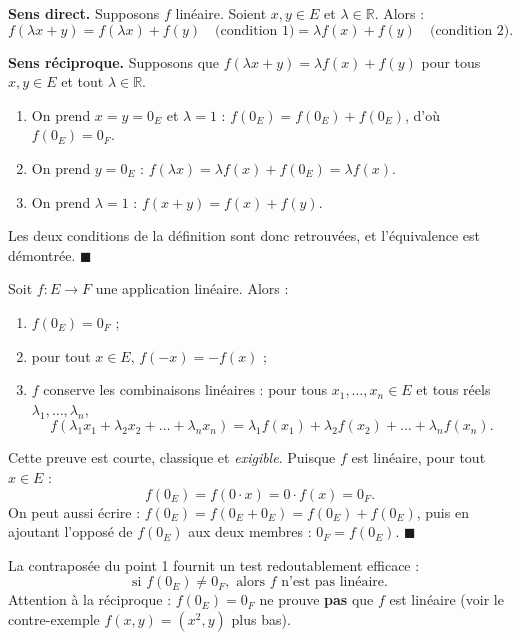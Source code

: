 \documentclass[11pt]{article}
\begin{document}
\begin{experience}
\textbf{Sens direct.} Supposons $f$ linéaire. Soient $x, y \in E$ et $\lambda \in \mathbb{R}$. Alors :
\[ f(\lambda x + y) = f(\lambda x) + f(y) \quad \text{(condition 1)} = \lambda f(x) + f(y) \quad \text{(condition 2)}. \]

\textbf{Sens réciproque.} Supposons que $f(\lambda x + y) = \lambda f(x) + f(y)$ pour tous $x, y \in E$ et tout $\lambda \in \mathbb{R}$.
\begin{enumerate}
\item On prend $x = y = 0_E$ et $\lambda = 1$ : $f(0_E) = f(0_E) + f(0_E)$, d'où $f(0_E) = 0_F$.
\item On prend $y = 0_E$ : $f(\lambda x) = \lambda f(x) + f(0_E) = \lambda f(x)$.
\item On prend $\lambda = 1$ : $f(x + y) = f(x) + f(y)$.
\end{enumerate}
Les deux conditions de la définition sont donc retrouvées, et l'équivalence est démontrée. $\blacksquare$
\end{experience}

\begin{propriete}[Conséquences immédiates -- Démonstration exigible au Probatoire pour $f(0_E)=0_F$]
Soit $f : E \to F$ une application linéaire. Alors :
\begin{enumerate}
\item $f(0_E) = 0_F$ ;
\item pour tout $x \in E$, $f(-x) = -f(x)$ ;
\item $f$ conserve les combinaisons linéaires : pour tous $x_1, \dots, x_n \in E$ et tous réels $\lambda_1, \dots, \lambda_n$,
\[ f(\lambda_1 x_1 + \lambda_2 x_2 + \dots + \lambda_n x_n) = \lambda_1 f(x_1) + \lambda_2 f(x_2) + \dots + \lambda_n f(x_n). \]
\end{enumerate}
\end{propriete}

\begin{experience}[Démonstration : $f(0_E) = 0_F$]
Cette preuve est courte, classique et \emph{exigible}. Puisque $f$ est linéaire, pour tout $x \in E$ :
\[ f(0_E) = f(0 \cdot x) = 0 \cdot f(x) = 0_F. \]
On peut aussi écrire : $f(0_E) = f(0_E + 0_E) = f(0_E) + f(0_E)$, puis en ajoutant l'opposé de $f(0_E)$ aux deux membres : $0_F = f(0_E)$. $\blacksquare$
\end{experience}

\begin{aretenir}
La contraposée du point 1 fournit un test redoutablement efficace :
\[ \text{si } f(0_E) \neq 0_F, \text{ alors } f \text{ n'est pas linéaire.} \]
Attention à la réciproque : $f(0_E) = 0_F$ ne prouve \textbf{pas} que $f$ est linéaire (voir le contre-exemple $f(x,y) = (x^2, y)$ plus bas).
\end{aretenir}
\end{document}
